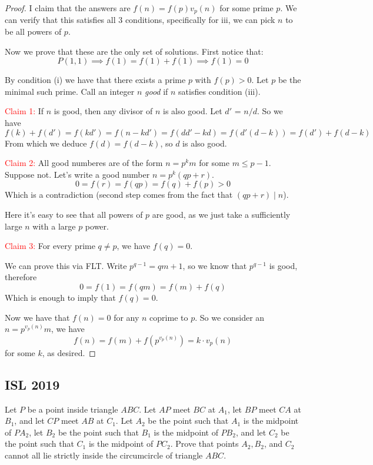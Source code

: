 \documentclass{article}
\theoremstyle{mytheoremstyle}
\theoremstyle{mytheoremstyle}
\theoremstyle{myproblemstyle}
\begin{document}
    \begin{proof}
        I claim that the answers are $f(n) = f(p)v_p(n)$ for some prime $p$. We can verify that this satisfies all 3 conditions, specifically for iii, we can pick $n$ to be all powers of $p$.

        Now we prove that these are the only set of solutions. First notice that: \[P(1, 1) \implies f(1) = f(1) + f(1) \implies f(1) = 0\]

        By condition (i) we have that there exists a prime $p$ with $f(p) > 0$. Let $p$ be the minimal such prime. Call an integer $n$ \textit{good} if $n$ satisfies condition (iii).

        \textcolor{red}{Claim 1:} If $n$ is good, then any divisor of $n$ is also good.
        Let $d'$ = $n/d$. So we have \[f(k) + f(d') = f(kd') = f(n - kd') = f(dd' - kd) = f(d'(d - k)) = f(d') + f(d-k)\]
        From which we deduce $f(d) = f(d-k)$, so $d$ is also good.

        \textcolor{red}{Claim 2:} All good numberes are of the form $n = p^km$ for some $m \leq p-1$. 
        Suppose not. Let's write a good number $n = p^k (qp + r)$. \[0 = f(r) = f(qp) = f(q) + f(p) > 0\] Which is a contradiction (second step comes from the fact that $(qp + r) \mid n$). 

        Here it's easy to see that all powers of $p$ are good, as we just take a sufficiently large $n$ with a large $p$ power. 

        \textcolor{red}{Claim 3:} For every prime $q \not= p$, we have $f(q) = 0$. 
        
        We can prove this via FLT. Write $p^{q-1} = qm + 1$, so we know that $p^{q-1}$ is good, therefore \[0 = f(1)= f(qm) = f(m) + f(q)\]
        Which is enough to imply that $f(q) = 0$.

        Now we have that $f(n) = 0$ for any $n$ coprime to $p$. So we consider an $n = p^{v_p{(n)}}m$, we have
        \[f(n) = f(m) + f(p^{v_p{(n)}}) = k\cdot v_p(n)\] for some $k$, as desired.
    \end{proof}

    \pagebreak

    \subsection{ISL 2019}

    \begin{problem}[2019 G4]
        Let $P$ be a point inside triangle $ABC$. Let $AP$ meet $BC$ at $A_1$, let $BP$ meet $CA$ at $B_1$, and let $CP$ meet $AB$ at $C_1$. Let $A_2$ be the point such that $A_1$ is the midpoint of $PA_2$, let $B_2$ be the point such that $B_1$ is the midpoint of $PB_2$, and let $C_2$ be the point such that $C_1$ is the midpoint of $PC_2$. Prove that points $A_2, B_2$, and $C_2$ cannot all lie strictly inside the circumcircle of triangle $ABC$.
    \end{problem}
\end{document}
